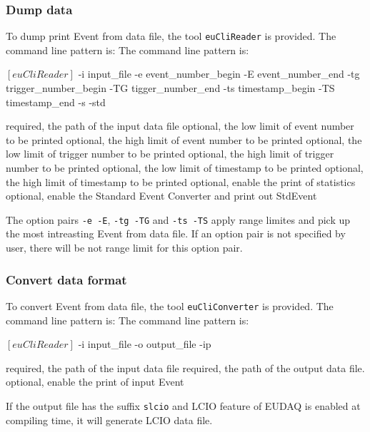 \subsubsection{Dump data}
\label{sec:dumpafterdatatacking}
To dump print Event from data file, the tool \texttt{euCliReader} is provided. The command line pattern is:
The command line pattern is:
\begin{listing}[mybash]
$[euCliReader]$ -i {input_file} -e {event_number_begin} -E {event_number_end} -tg {trigger_number_begin} -TG {tigger_number_end} -ts {timestamp_begin} -TS {timestamp_end} -s -std
\end{listing}
\begin{description}
required, the path of the input data file
optional, the low limit of event number to be printed 
optional, the high limit of event number to be printed 
optional, the low limit of trigger number to be printed 
optional, the high limit of trigger number to be printed 
optional, the low limit of timestamp to be printed 
optional, the high limit of timestamp to be printed
optional, enable the print of statistics 
optional, enable the Standard Event Converter and print out StdEvent
\end{description}

The option pairs \texttt{-e -E}, \texttt{-tg -TG} and \texttt{-ts -TS} apply range limites and pick up the most intreasting Event from data file. If an option pair is not specified by user, there will be not range limit for this option pair.

\subsubsection{Convert data format}
\label{sec:convertafterdatatacking}
To convert Event from data file, the tool \texttt{euCliConverter} is provided. The command line pattern is:
The command line pattern is:
\begin{listing}[mybash]
$[euCliReader]$ -i {input_file} -o {output_file} -ip
\end{listing}
\begin{description}
required, the path of the input data file
required, the path of the output data file. 
optional, enable the print of input Event 
\end{description}

If the output file has the suffix \texttt{slcio} and LCIO feature of EUDAQ is enabled at compiling time, it will generate LCIO data file.
